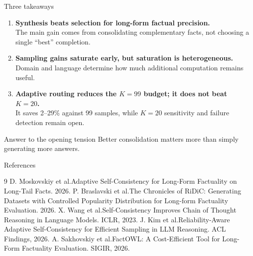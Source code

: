 \documentclass[aspectratio=169,10pt]{beamer}
\begin{document}
\begin{frame}{Three takeaways}
  \begin{enumerate}
    \item \textbf{Synthesis beats selection for long-form factual precision.}\\
          \small The main gain comes from consolidating complementary facts, not choosing a single ``best'' completion.
    \vspace{6pt}
    \item \textbf{Sampling gains saturate early, but saturation is heterogeneous.}\\
          \small Domain and language determine how much additional computation remains useful.
    \vspace{6pt}
    \item \textbf{Adaptive routing reduces the $K=99$ budget; it does not beat $K=20$.}\\
          \small It saves 2--29\% against 99 samples, while $K=20$ sensitivity and failure detection remain open.
  \end{enumerate}
  \vfill
  \begin{block}{Answer to the opening tension}
    \centering
    \large Better consolidation matters more than simply generating more answers.
  \end{block}
\end{frame}

\begin{frame}{References}
  \small
  \begin{thebibliography}{9}
      D. Moskovskiy et al.\newblock Adaptive Self-Consistency for Long-Form Factuality on Long-Tail Facts. 2026.
      P. Braslavski et al.\newblock The Chronicles of RiDiC: Generating Datasets with Controlled Popularity Distribution for Long-form Factuality Evaluation. 2026.
      X. Wang et al.\newblock Self-Consistency Improves Chain of Thought Reasoning in Language Models. ICLR, 2023.
      J. Kim et al.\newblock Reliability-Aware Adaptive Self-Consistency for Efficient Sampling in LLM Reasoning. ACL Findings, 2026.
      A. Sakhovskiy et al.\newblock FactOWL: A Cost-Efficient Tool for Long-Form Factuality Evaluation. SIGIR, 2026.
  \end{thebibliography}
\end{frame}
\end{document}
